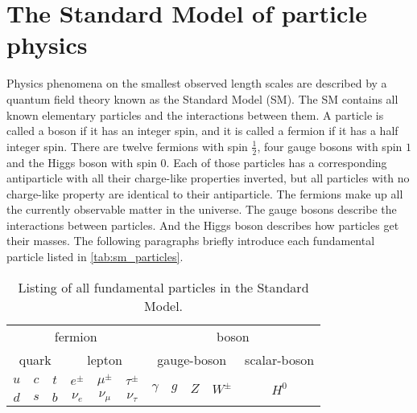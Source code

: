 \section{The Standard Model of particle physics}

Physics phenomena on the smallest observed length scales are described by a quantum field theory known as the Standard Model (SM).
The SM contains all known elementary particles and the interactions between them.
A particle is called a boson if it has an integer spin, and it is called a fermion if it has a half integer spin.
There are twelve fermions with spin $\frac{1}{2}$, four gauge bosons with spin $1$ and the Higgs boson with spin $0$.
Each of those particles has a corresponding antiparticle with all their charge-like properties inverted, but all particles with no charge-like property are identical to their antiparticle.
The fermions make up all the currently observable matter in the universe.
The gauge bosons describe the interactions between particles.
And the Higgs boson describes how particles get their masses.
The following paragraphs briefly introduce each fundamental particle listed in \autoref{tab:sm_particles}.

\begin{table}
    \centering
    \caption{Listing of all fundamental particles in the Standard Model.}
    \begin{tabular}{c c c | c c c | c c c c | c}
        \toprule
        \multicolumn{6}{c|}{fermion} & \multicolumn{5}{c}{boson} \\
        \multicolumn{3}{c}{quark} & \multicolumn{3}{c|}{lepton} & \multicolumn{4}{c}{gauge-boson} & \multicolumn{1}{c}{scalar-boson} \\
        \midrule
        $u$ & $c$ & $t$ & $e^\pm$ & $\mu^\pm$ & $\tau^\pm$ & \multirow{2}{*}{$\gamma$} & \multirow{2}{*}{$g$} & \multirow{2}{*}{$Z$} & \multirow{2}{*}{$W^\pm$} & \multirow{2}{*}{$H^0$} \\
        $d$ & $s$ & $b$ & $\nu_e$ & $\nu_\mu$ & $\nu_\tau$ &&&&& \\
        \bottomrule
    \end{tabular}
    \label{tab:sm_particles}
\end{table}

